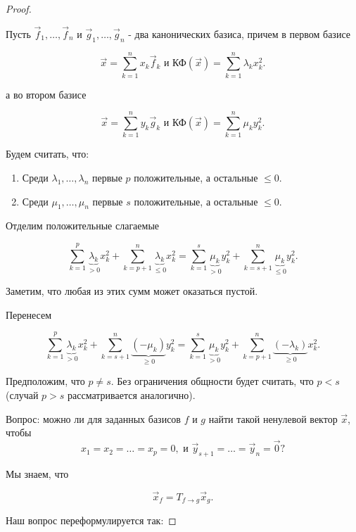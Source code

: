 \begin{proof}~

    Пусть $\vec{f}_1, \ldots, \vec{f}_n$ и $\vec{g}_1, \ldots, \vec{g}_n$ - два канонических базиса, причем в первом базисе 

    $$\vec{x} = \sum_{k = 1}^{n}x_k\vec{f}_k \text{ и КФ}(\vec{x}) = \sum_{k = 1}^{n}\lambda_kx^2_k.$$

    а во втором базисе

    $$\vec{x} = \sum_{k = 1}^{n}y_k\vec{g}_k \text{ и КФ}(\vec{x}) = \sum_{k = 1}^{n}\mu_ky^2_k.$$

    Будем считать, что:

    \begin{enumerate}
        \item Среди $\lambda_1, \ldots, \lambda_n$ первые $p$ положительные, а остальные $\leq 0$.
        \item Среди $\mu_1, \ldots, \mu_n$ первые $s$ положительные, а остальные $\leq 0$.
    \end{enumerate}

    Отделим положительные слагаемые

    $$\sum_{k = 1}^{p}\underbrace{\lambda_k}_{> 0}x^2_k + \sum_{k = p + 1}^{n}\underbrace{\lambda_k}_{\leq 0}x^2_k = \sum_{k = 1}^{s}\underbrace{\mu_k}_{> 0}y^2_k + \sum_{k = s + 1}^{n}\underbrace{\mu_k}_{\leq 0}y^2_k.$$

    Заметим, что любая из этих сумм может оказаться пустой.

    Перенесем

    \begin{equation}
        \sum_{k = 1}^{p}\underbrace{\lambda_k}_{> 0}x^2_k + \sum_{k = s + 1}^{n}\underbrace{(-\mu_k)}_{\geq 0}y^2_k = \sum_{k = 1}^{s}\underbrace{\mu_k}_{> 0}y^2_k + \sum_{k = p + 1}^{n}\underbrace{(-\lambda_k)}_{\geq 0}x^2_k.
        \label{equation:equation_36_2_1}
    \end{equation}

    Предположим, что $p \ne s$. Без ограничения общности будет считать, что $p < s$ (случай $p > s$ рассматривается аналогично).

    Вопрос: можно ли для заданных базисов $f$ и $g$ найти такой ненулевой вектор $\vec{x}$, чтобы 
    $$x_1 = x_2 = \ldots = x_p = 0, \text{ и } \vec{y}_{s + 1} = \ldots = \vec{y}_n = \vec{0}?$$

    Мы знаем, что 

    $$\vec{x}_f = T_{f \to g}\vec{x}_g.$$

    Наш вопрос переформулируется так:


\end{proof}
